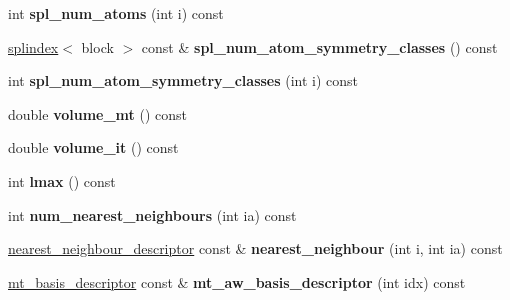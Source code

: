 \begin{DoxyCompactItemize}
\item 
\hypertarget{classsirius_1_1_unit__cell_ae0b1bf7939ad2e809bff3e47cbc7154a}{}int {\bfseries spl\+\_\+num\+\_\+atoms} (int i) const \label{classsirius_1_1_unit__cell_ae0b1bf7939ad2e809bff3e47cbc7154a}

\item 
\hypertarget{classsirius_1_1_unit__cell_acb139cc2a3d03408d569cf1e4ae684ca}{}\hyperlink{classsddk_1_1splindex}{splindex}$<$ block $>$ const \& {\bfseries spl\+\_\+num\+\_\+atom\+\_\+symmetry\+\_\+classes} () const \label{classsirius_1_1_unit__cell_acb139cc2a3d03408d569cf1e4ae684ca}

\item 
\hypertarget{classsirius_1_1_unit__cell_abf0ab6560ebd473cf9b56ec99b6c44e3}{}int {\bfseries spl\+\_\+num\+\_\+atom\+\_\+symmetry\+\_\+classes} (int i) const \label{classsirius_1_1_unit__cell_abf0ab6560ebd473cf9b56ec99b6c44e3}

\item 
\hypertarget{classsirius_1_1_unit__cell_a77a2c25fafbb1d815255b7f9140e0f16}{}double {\bfseries volume\+\_\+mt} () const \label{classsirius_1_1_unit__cell_a77a2c25fafbb1d815255b7f9140e0f16}

\item 
\hypertarget{classsirius_1_1_unit__cell_a39fd72b44aaaee8c9206de970d929515}{}double {\bfseries volume\+\_\+it} () const \label{classsirius_1_1_unit__cell_a39fd72b44aaaee8c9206de970d929515}

\item 
\hypertarget{classsirius_1_1_unit__cell_a3b428a2703900fa03b7fb226d5137144}{}int {\bfseries lmax} () const \label{classsirius_1_1_unit__cell_a3b428a2703900fa03b7fb226d5137144}

\item 
\hypertarget{classsirius_1_1_unit__cell_a38fcdfbd4c0e7a186fe1781c44ab49e3}{}int {\bfseries num\+\_\+nearest\+\_\+neighbours} (int ia) const \label{classsirius_1_1_unit__cell_a38fcdfbd4c0e7a186fe1781c44ab49e3}

\item 
\hypertarget{classsirius_1_1_unit__cell_add3ce169342c0b202da24bb749111c3c}{}\hyperlink{structnearest__neighbour__descriptor}{nearest\+\_\+neighbour\+\_\+descriptor} const \& {\bfseries nearest\+\_\+neighbour} (int i, int ia) const \label{classsirius_1_1_unit__cell_add3ce169342c0b202da24bb749111c3c}

\item 
\hypertarget{classsirius_1_1_unit__cell_ae973f4581ba094690c282bf365bc68d2}{}\hyperlink{structmt__basis__descriptor}{mt\+\_\+basis\+\_\+descriptor} const \& {\bfseries mt\+\_\+aw\+\_\+basis\+\_\+descriptor} (int idx) const \label{classsirius_1_1_unit__cell_ae973f4581ba094690c282bf365bc68d2}


\end{DoxyCompactItemize}
